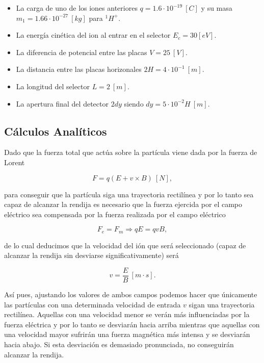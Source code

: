 \documentclass[journal]{IEEEtran}
\begin{document}
\begin{itemize}
    \item La carga de uno de los iones anteriores $q = 1.6\cdot10^{-19}~[C]$ y su masa $m_1 = 1.66\cdot10^{-27}~[kg]$ para $^1H^+$.
    \item La energía cinética del ion al entrar en el selector $E_c = 30 [eV]$.
    \item La diferencia de potencial entre las placas $V = 25~[V]$.
    \item La distancia entre las placas horizonales $2H = 4\cdot 10^{-1}~[m]$.
    \item La longitud del selector $L = 2~[m]$.
    \item La apertura final del detector $2dy$ siendo $dy = 5\cdot10^{-2}H~[m]$.
\end{itemize}

\subsection{Cálculos Analíticos}

Dado que la fuerza total que actúa sobre la partícula viene dada por la fuerza de Lorent

\begin{equation}
    F = q(E + v \times B)~[N],
\end{equation}

para conseguir que la partícula siga una trayectoria rectilínea y por lo tanto sea capaz de alcanzar la rendija es necesario que la fuerza ejercida por el campo eléctrico sea compensada por la fuerza realizada por el campo eléctrico

\begin{equation}
    F_e = F_m \Rightarrow qE = qvB,
\end{equation}

de lo cual deducimos que la velocidad del ión que será seleccionado (capaz de alcanzar la rendija sin desviarse significativamente) será

\begin{equation}
    v = \displaystyle\frac{E}{B}~[m\cdot s].
\end{equation}

Así pues, ajustando los valores de ambos campos podemos hacer que únicamente las partículas con una determinada velocidad de entrada $v$ sigan una trayectoria rectilínea. Aquellas con una velocidad menor se verán más influenciadas por la fuerza eléctrica y por lo tanto se desviarán hacia arriba mientras que aquellas con una velocidad mayor sufrirán una fuerza magnética más intensa y se desviarán hacia abajo. Si esta desviación es demasiado pronunciada, no conseguirán alcanzar la rendija.
\end{document}
